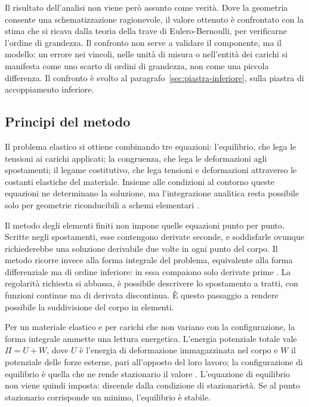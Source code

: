 Il risultato dell'analisi non viene però assunto come verità. Dove la
geometria consente una schematizzazione ragionevole, il valore ottenuto è
confrontato con la stima che si ricava dalla teoria della trave di
Eulero-Bernoulli, per verificarne l'ordine di grandezza. Il confronto non
serve a validare il componente, ma il modello: un errore nei vincoli, nelle
unità di misura o nell'entità dei carichi si manifesta come uno scarto di ordini
di grandezza, non come una piccola differenza. Il confronto è svolto al
paragrafo~\ref{sec:piastra-inferiore}, sulla piastra di accoppiamento inferiore.

\subsection{Principi del metodo}
\label{sec:fem-principi}

Il problema elastico si ottiene combinando tre equazioni: l'equilibrio, che lega
le tensioni ai carichi applicati; la congruenza, che lega le deformazioni agli
spostamenti; il legame costitutivo, che lega tensioni e deformazioni attraverso
le costanti elastiche del materiale. Insieme alle condizioni al contorno queste
equazioni ne determinano la soluzione, ma l'integrazione analitica resta
possibile solo per geometrie riconducibili a schemi elementari
\cite[cap.~3]{santi2024}.

Il metodo degli elementi finiti non impone quelle equazioni punto per punto.
Scritte negli spostamenti, esse contengono derivate seconde, e soddisfarle
ovunque richiederebbe una soluzione derivabile due volte in ogni punto del
corpo. Il metodo ricorre invece alla forma integrale del problema, equivalente
alla forma differenziale ma di ordine inferiore: in essa compaiono solo derivate
prime \cite[cap.~11]{santi2024}. La regolarità richiesta si abbassa, è possibile descrivere lo spostamento a tratti, con funzioni continue ma di derivata
discontinua. È questo passaggio a rendere possibile la
suddivisione del corpo in elementi.

Per un materiale elastico e per carichi che non variano con la configurazione,
la forma integrale ammette una lettura energetica. L'energia potenziale totale
vale $\Pi = U + W$, dove $U$ è l'energia di deformazione immagazzinata nel corpo
e $W$ il potenziale delle forze esterne, pari all'opposto del loro lavoro; la
configurazione di equilibrio è quella che ne rende stazionario il valore
\cite[cap.~11]{santi2024}. L'equazione di equilibrio non viene quindi imposta:
discende dalla condizione di stazionarietà. Se al punto stazionario corrisponde
un minimo, l'equilibrio è stabile.

